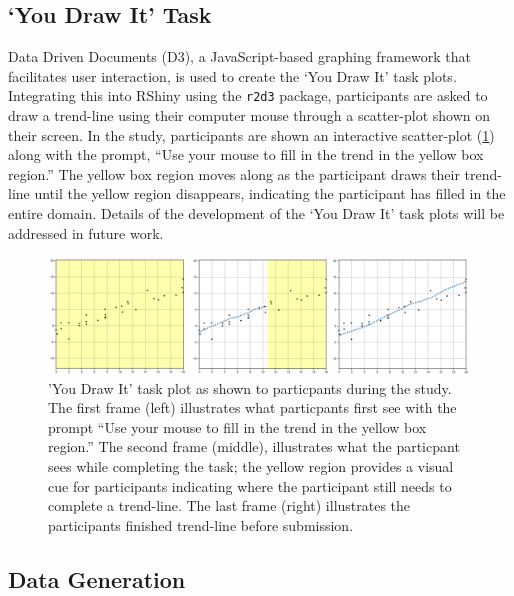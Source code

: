 \documentclass[12pt]{article}
\begin{document}
\hypertarget{you-draw-it-task}{%
\subsection{`You Draw It' Task}\label{you-draw-it-task}}

Data Driven Documents (D3), a JavaScript-based graphing framework that
facilitates user interaction, is used to create the `You Draw It' task
plots. Integrating this into RShiny using the \texttt{r2d3} package,
participants are asked to draw a trend-line using their computer mouse
through a scatter-plot shown on their screen. In the study, participants
are shown an interactive scatter-plot (\cref{fig:ydi-stimuli}) along
with the prompt, ``Use your mouse to fill in the trend in the yellow box
region.'' The yellow box region moves along as the participant draws
their trend-line until the yellow region disappears, indicating the
participant has filled in the entire domain. Details of the development
of the `You Draw It' task plots will be addressed in future work.

\begin{figure}[tbp]

{\centering \includegraphics[width=1\linewidth,]{images/ydi-stimuli} 

}

\caption{'You Draw It' task plot as shown to particpants during the study. The first frame (left) illustrates what particpants first see with the prompt “Use your mouse to fill in the trend in the yellow box region.” The second frame (middle), illustrates what the particpant sees while completing the task; the yellow region provides a visual cue for participants indicating where the participant still needs to complete a trend-line. The last frame (right) illustrates the participants finished trend-line before submission.}\label{fig:ydi-stimuli}
\end{figure}

\hypertarget{data-generation}{%
\subsection{Data Generation}\label{data-generation}}
\end{document}
